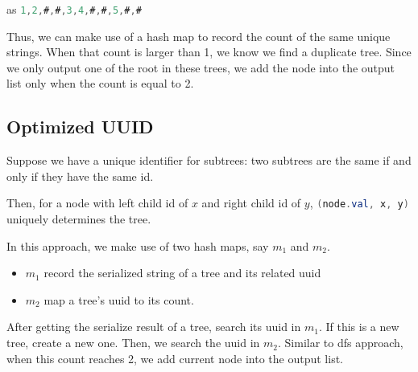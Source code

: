 \begin{figure}[H]
\end{figure}

as \lstinline[language=Java, basicstyle=\small\ttfamily, keywordstyle=\bfseries\color{green!40!black}]|1,2,#,#,3,4,#,#,5,#,#|

Thus, we can make use of a hash map to record the count of the same unique strings. When that count is larger than 1, we know we find a duplicate tree. Since we only output one of the root in these trees, we add the node into the output list only when the count is equal to 2.

\subsection{Optimized UUID}
Suppose we have a unique identifier for subtrees: two subtrees are the same if and only if they have the same id.

Then, for a node with left child id of $x$ and right child id of $y$, \lstinline[language=Java, basicstyle=\small\ttfamily, keywordstyle=\bfseries\color{green!40!black}]|(node.val, x, y)| uniquely determines the tree.

In this approach, we make use of two hash maps, say $m_1$ and $m_2$. 
\begin{itemize}
\item $m_1$ record the serialized string of a tree and its related uuid
\item $m_2$ map a tree's uuid to its count.
\end{itemize}

After getting the serialize result of a tree, search its uuid in $m_1$. If this is a new tree, create a new one. Then, we search the uuid in $m_2$. Similar to dfs approach, when this count reaches 2, we add current node into the output list.
